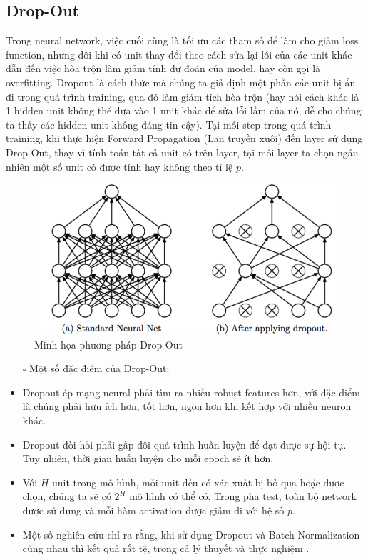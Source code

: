 \subsection{Drop-Out}
\label{ss:dropout}
Trong neural network, việc cuối cùng là tối ưu các tham số để làm cho giảm loss function, nhưng đôi khi có unit thay đổi theo cách sửa lại lỗi của các unit khác dẫn đến việc hòa trộn làm giảm tính dự đoán của model, hay còn gọi là overfitting. Dropout là cách thức mà chúng ta giả định một phần các unit bị ẩn đi trong quá trình training, qua đó làm giảm tích hòa trộn (hay nói cách khác là 1 hidden unit không thể dựa vào 1 unit khác để sửa lỗi lầm của nó, dễ cho chúng ta thấy các hidden unit không đáng tin cậy). Tại mỗi step trong quá trình training, khi thực hiện Forward Propagation (Lan truyền xuôi) đến layer sử dụng Drop-Out, thay vì tính toán tất cả unit có trên layer, tại mỗi layer ta chọn ngẫu nhiên một số unit có được tính hay không theo tỉ lệ $p$.

\FloatBarrier
\begin{figure}[htp]
\begin{center}
\includegraphics[scale=0.5]{chap2/c2_figs/drop_out.png}
\end{center}
\caption{Minh họa phương pháp Drop-Out}
\label{fig:dropout}
\end{figure}
\FloatBarrier

\begin{itemize}
\item[$\square$] Một số đặc điểm của Drop-Out:
\item Dropout ép mạng neural phải tìm ra nhiều robust features hơn, với đặc điểm là chúng phải hữu ích hơn, tốt hơn, ngon hơn khi kết hợp với nhiều neuron khác.
\item Dropout đòi hỏi phải gấp đôi quá trình huấn luyện để đạt được sự hội tụ. Tuy nhiên, thời gian huấn luyện cho mỗi epoch sẽ ít hơn.
\item Với $H$ unit trong mô hình, mỗi unit đều có xác xuất bị bỏ qua hoặc được chọn, chúng ta sẽ có $2^{H}$ mô hình có thể có. Trong pha test, toàn bộ network được sử dụng và mỗi hàm activation được giảm đi với hệ số $p$.
\item Một số nghiên cứu chỉ ra rằng, khi sử dụng Dropout và Batch Normalization cùng nhau thì kết quả rất tệ, trong cả lý thuyết và thực nghiệm \cite{li2019understanding}.
\end{itemize}

